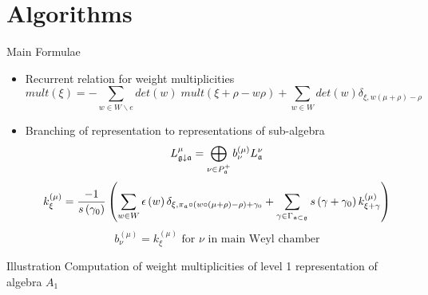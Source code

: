 \documentclass{beamer}
\theoremstyle{definition} \newtheorem{Def}{Definition}
\begin{document}
\section{Algorithms}
\label{sec:algorithms}
\begin{frame}{Main Formulae}
  \begin{itemize}
  \item Recurrent relation for weight multiplicities
    \begin{equation}
      \label{eq:2}
      mult(\xi)=-\sum_{w\in W\backslash e}det(w)\;mult(\xi+\rho-w\rho)+\sum_{w\in W}det(w)\delta_{\xi,w(\mu+\rho)-\rho}
    \end{equation}
  \item Branching of representation to representations of sub-algebra
    \begin{equation}
      \label{eq:4}
      L_{\frak{g}\downarrow \frak{a}}^{\mu }=\bigoplus\limits_{\nu \in P_{\frak{a}%
        }^{+}}b_{\nu }^{\left( \mu \right) }L_{\frak{a}}^{\nu }
    \end{equation}
    \begin{equation}
      \label{recurrent-relation}
      k_{\xi }^{\left( \mu \right) }=\frac{-1}{s\left( \gamma _{0}\right) }\left(
        \sum_{w\in W}\epsilon \left( w\right) \delta _{\xi ,\pi _{\frak{a}}\circ
          \left( w\circ (\mu +\rho )-\rho \right) +\gamma _{0}}+\sum_{\gamma \in
          \Gamma _{\frak{a}\subset \frak{g}}}s\left( \gamma +\gamma _{0}\right) k_{\xi
          +\gamma }^{\left( \mu \right) }\right)   
    \end{equation}
    \begin{equation}
      \label{eq:5}
      b_{\nu }^{\left( \mu \right) }=k_{\xi }^{\left( \mu \right) } \text{ for }\nu\text{ in main Weyl chamber}
    \end{equation}
  \end{itemize}
\end{frame}
\begin{frame}{Illustration}
Computation of weight multiplicities of level 1
representation of algebra $A_1$
  \begin{figure}[bh]
  \noindent{}
  \label{A1 with star}
\end{figure}

\end{frame}
\end{document}
